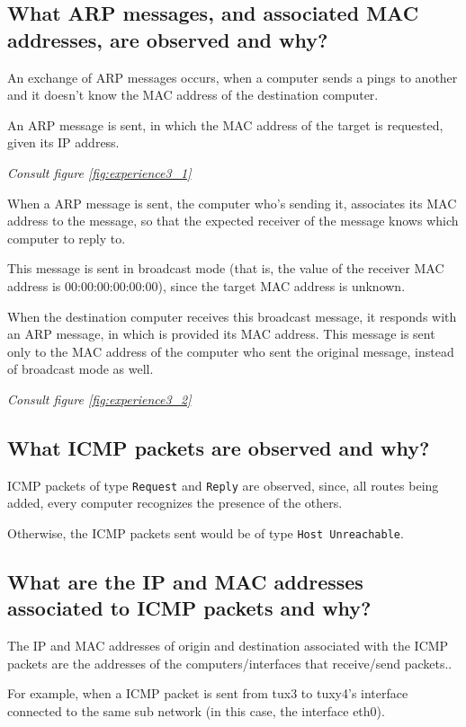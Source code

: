 \documentclass[11pt]{report}
\begin{document}
\subsection{What ARP messages, and associated MAC addresses, are observed and
why?}

An exchange of ARP messages occurs, when a computer sends a pings to another and it doesn't know the MAC address of the destination computer.

An ARP message is sent, in which the MAC address of the target is requested, given its IP address. 

\textit{Consult figure \ref{fig:experience3_1}}

When a ARP message is sent, the computer who's sending it, associates its MAC address to the message, so that the expected receiver of the message knows which computer to reply to.

This message is sent in broadcast mode (that is, the value of the receiver MAC address is 00:00:00:00:00:00), since the target MAC address is unknown. 

When the destination computer receives this broadcast message, it responds with an ARP message, in which is provided its MAC address. This message is sent only to the MAC address of the computer who sent the original message, instead of broadcast mode as well.

\textit{Consult figure \ref{fig:experience3_2}}

\subsection{What ICMP packets are observed and why?}

ICMP packets of type \texttt{Request} and \texttt{Reply} are observed, since, all routes being added, every computer recognizes the presence of the others. 

Otherwise, the ICMP packets sent would be of type \texttt{Host Unreachable}.

\subsection{What are the IP and MAC addresses associated to ICMP packets and
why?}

The IP and MAC addresses of origin and destination associated with the ICMP packets are the addresses of the computers/interfaces that receive/send packets..

For example, when a ICMP packet is sent from tux3 to tuxy4's interface connected to the same sub network (in this case, the interface eth0).
\end{document}
